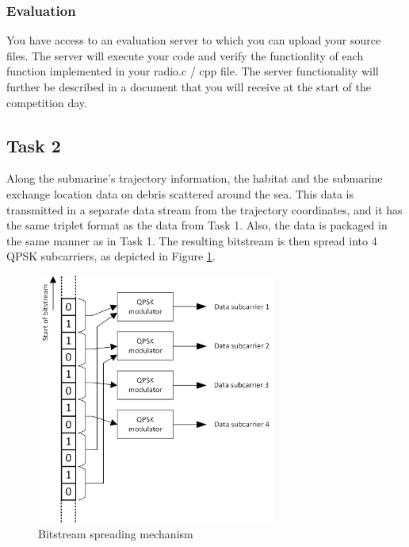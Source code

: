 \documentclass[openany]{book}
\begin{document}
	
	\subsubsection{Evaluation}
	
	You have access to an evaluation server to which you can upload your source 
	files.
	The server will execute your code and verify the functionlity of each 
	function implemented in your \textsf{radio.c / cpp} file.
	The server functionality will further be described in a document that you 
	will receive at the start of the competition day.
	
	\subsection{Task 2}
	
	Along the submarine's trajectory information, the habitat and the submarine 
	exchange location data on debris scattered around the sea. This data is 
	transmitted in a separate data stream from the trajectory coordinates, and 
	it has the same triplet format as the data from Task 1. Also, the data is 
	packaged in the same manner as in Task 1. The resulting bitstream is then 
	spread into 4 QPSK subcarriers, as depicted in Figure \ref{fig:spread}.
	\begin{figure}[h!]
		\centering
		\includegraphics[width=0.7\textwidth]{Images/spread.png}
		\caption{Bitstream spreading mechanism}
		\label{fig:spread}
	\end{figure}
	
\end{document}
